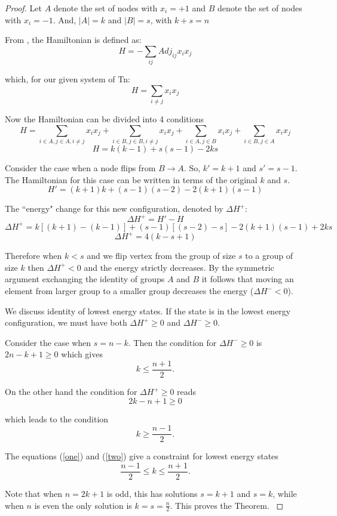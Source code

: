 \documentclass[11pt,a4paper]{article}
\theoremstyle{definition}
\theoremstyle{remark}
\begin{document}
\begin{proof}
Let $A$ denote the set of nodes with $x_i = +1$ and $B$ denote the set of nodes with $x_i = -1$. And, $|A| = k$ and $|B| = s$, with $k+s=n$

From \cite{font-clos_topography_2018}, the Hamiltonian is defined as:
    $$ H = -\sum_{ij} Adj_{ij} x_i x_j$$
    
which, for our given system of Tn:
    $$H = \sum_{i \neq j} x_i x_j$$

Now the Hamiltonian can be divided into 4 conditions
$$ H = \sum_{i\in A, j\in A, i\neq j}x_i x_j + \sum_{i\in B, j\in B, i\neq j}x_i x_j + \sum_{i\in A, j\in B}x_i x_j + \sum_{i\in B, j\in A}x_i x_j$$
$$ H = k(k-1) + s(s-1) - 2ks$$

Consider the case when a node flips from $B \rightarrow A$. So, $k' = k+1$ and $s' = s-1$. The Hamiltonian for this case can be written in terms of the original $k$ and $s$.
$$ H' = (k+1)k + (s-1)(s-2) - 2 (k+1)(s-1)$$

The ``energy" change for this new configuration, denoted by $\Delta H^+$:
$$\Delta H^+ = H' - H$$
$$\Delta H^+ = k[(k+1) - (k-1)] + (s-1) [(s-2)-s] - 2(k+1)(s-1) + 2ks$$
\begin{equation} \label{deltaH}
\Delta H^+ = 4(k-s+1)
\end{equation}

Therefore  when $k<s$ and we flip vertex from the group of size $s$ to a group of size $k$ then $\Delta H^+ <0$ and the energy strictly decreases. 
By the symmetric argument exchanging the identity of groups $A$ and $B$ it follows that moving an element from larger group to a smaller group decreases the energy ($\Delta H^- <0$).

We discuss identity of lowest energy states. If the state is in the lowest energy configuration, we must have both   $\Delta H^+\geq 0$ and $\Delta H^- \geq 0$.

Consider the case when $s= n-k$. Then the condition for  $\Delta H^- \geq 0$ 
is $2n-k+1 \geq 0$ which gives 
\begin{equation}\label{one}
k \leq \frac{n+1}{2}.
\end{equation}

On the other hand the condition for $\Delta H^+ \geq 0$ reads 
\[ 2k-n+1 \geq 0\]

which leads to the condition
\begin{equation}\label{two}
k\geq \frac{n-1}{2}.
\end{equation}

The equations (\ref{one}) and (\ref{two}) give a constraint for lowest energy states 
$$\frac{n - 1}{2} \leq k \leq \frac{n+1}{2}.$$

Note that when $n=2k+1$ is odd, this has solutions $s=k+1$ and $s= k$, while when $n$ is even the only solution is $k=s =\frac{n}{2}$. This proves the Theorem.
\label{n2proof}
\end{proof}
\end{document}
